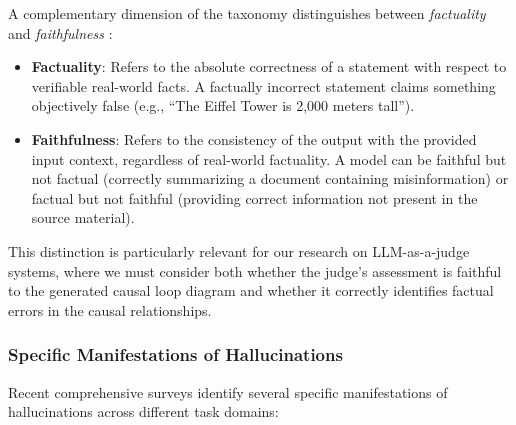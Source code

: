 A complementary dimension of the taxonomy distinguishes between \textit{factuality} and \textit{faithfulness} \citep{huang2023survey}:

\begin{itemize}
    \item \textbf{Factuality}: Refers to the absolute correctness of a statement with respect to verifiable real-world facts. A factually incorrect statement claims something objectively false (e.g., ``The Eiffel Tower is 2,000 meters tall'').
    
    \item \textbf{Faithfulness}: Refers to the consistency of the output with the provided input context, regardless of real-world factuality. A model can be faithful but not factual (correctly summarizing a document containing misinformation) or factual but not faithful (providing correct information not present in the source material).
\end{itemize}

This distinction is particularly relevant for our research on LLM-as-a-judge systems, where we must consider both whether the judge's assessment is faithful to the generated causal loop diagram and whether it correctly identifies factual errors in the causal relationships.

\subsubsection{Specific Manifestations of Hallucinations}

Recent comprehensive surveys \citep{huang2023survey,arxiv2025comprehensive,ji2023survey} identify several specific manifestations of hallucinations across different task domains:


